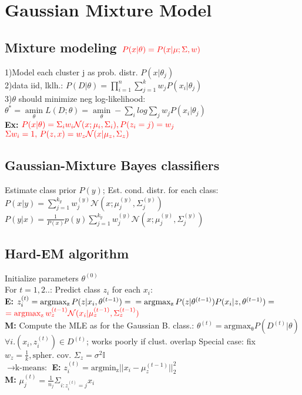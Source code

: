 \section*{Gaussian Mixture Model}
\subsection*{Mixture modeling $\color{red} P(x|\theta)=P(x|\mu;\Sigma,w)$}
1)Model each cluster j as prob. distr. $P(x|\theta_j)$\\
2)data iid, lklh.: $P(D|\theta) = \prod_{i=1}^n \sum_{j=1}^k w_j P(x_i|\theta_j)$\\
3)$\theta$ should minimize neg log-likelihood:\\ $\theta^*=\underset{\theta}{\operatorname{amin}}L(D;\theta) = \underset{\theta}{\operatorname{amin}} - \sum_i log \sum_j w_j P(x_i| \theta_j)$\\
\textbf{Ex:} $\color{red} P(x|\theta)=\Sigma_iw_i\mathcal{N}(x;\mu_i,\Sigma_i), P(z_i=j)=w_j$\\
$\color{red} \Sigma w_i=1,\, P(z,x)=w_z\mathcal{N}(x|\mu_z,\Sigma_z)$

\subsection*{Gaussian-Mixture Bayes classifiers}
Estimate class prior $P(y)$; Est. cond. distr. for each class:
$P(x|y) = \sum_{j=1}^{k_y} w_j^{(y)} \mathcal{N}(x; \mu_j^{(y)}, \Sigma_j^{(y)})$\\
$P(y|x) = \frac{1}{P(x)} p(y) \sum_{j=1}^{k_y} w_j^{(y)} \mathcal{N}(x; \mu_j^{(y)}, \Sigma_j^{(y)})$

\subsection*{Hard-EM algorithm}
Initialize parameters $\theta^{(0)}$\\
For $t=1,2..$:
Predict class $z_i$ for each $x_i$:\\
\textbf{E: }$z_i^{(t)} = \operatorname{argmax_z} P(z|x_i, \theta^{(t-1)})=\\
= \operatorname{argmax_z} P(z|\theta^{(t-1)}) P(x_i|z,\theta^{(t-1)})=$\\
$\color{red} =\operatorname{argmax_z} w_z^{(t-1)}\mathcal{N}(x_i|\mu_z^{(t-1)},\Sigma_z^{(t-1)})$\\
\textbf{M: }Compute the MLE as for the Gaussian B. class.:
$\theta^{(t)} = \operatorname{argmax_\theta} P(D^{(t)}|\theta)$\\
\(\forall i. (x_i, z_i^{(t)}) \in D^{(t)}\); works poorly if clust. overlap
Special case: fix $w_z=\frac{1}{k}, \text{spher. cov. } \Sigma_z=\sigma^2\mathbb{I}$\\
$\rightarrow \text{k-means:}$ \textbf{E: } $z_i^{(t)}=\operatorname{argmin_z}||x_i-\mu_z^{(t-1)}||_2^2$\\
\textbf{M: }$\mu_j^{(t)}=\frac{1}{n_j}\Sigma _{i:z_i^{(t)}=j} x_i$
\iffalse
$\text{; Soft-EM:as }\sigma \rightarrow 0,\\ \gamma_i(x_i) \rightarrow \{0,1\} \text{ determ.}$
\fi

